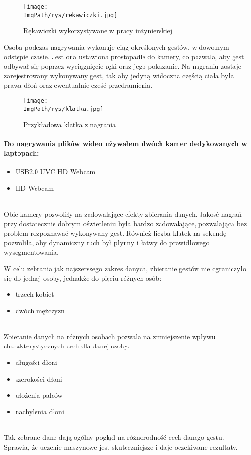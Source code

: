 \documentclass[a4paper,12pt,twoside,openany]{report}
\newcommand{\ImgPath}{.}
\begin{document}
\begin{figure}[H]	
	\centering
	\texttt{[image: \\ImgPath/rys/rekawiczki.jpg]}
	
	\caption{Rękawiczki wykorzystywane w pracy inżynierskiej}
\end{figure}

Osoba podczas nagrywania wykonuje ciąg określonych gestów, w dowolnym odstępie czasie. Jest ona ustawiona prostopadle do kamery, co pozwala, aby gest odbywał się poprzez wyciągnięcie ręki oraz jego pokazanie. Na nagraniu zostaje zarejestrowany wykonywany gest, tak aby jedyną widoczna częścią ciała była prawa dłoń oraz ewentualnie cześć przedramienia. 

\begin{figure}[H]	
	\centering
	\texttt{[image: \\ImgPath/rys/klatka.jpg]}
	
	\caption{Przykładowa klatka z nagrania}
\end{figure}

\paragraph{Do nagrywania plików wideo używałem dwóch kamer dedykowanych w laptopach:}
\begin{itemize}
	\item USB2.0 UVC HD Webcam
	\item HD Webcam
\end{itemize}
\mbox{} \\

Obie kamery pozwoliły na zadowalające efekty zbierania danych. Jakość nagrań przy dostatecznie dobrym oświetleniu była bardzo zadowalające, pozwalająca bez problem rozpoznawać wykonywany gest. Również liczba klatek na sekundę pozwoliła, aby dynamiczny ruch był płynny i łatwy do prawidłowego wysegmentowania.

W celu zebrania jak najszerszego zakres danych, zbieranie gestów nie ograniczyło się do jednej osoby, jednakże do pięciu różnych osób:
\begin{itemize}
	\item trzech kobiet
	\item dwóch mężczyzn
\end{itemize}
\mbox{} \\
\indent 
Zbieranie danych na różnych osobach pozwala na zmniejszenie wpływu charakterystycznych cech dla danej osoby:
\begin{itemize}
	\item długości dłoni
	\item szerokości dłoni
	\item ułożenia palców
	\item nachylenia dłoni
\end{itemize}
\mbox{} \\
\indent
Tak zebrane dane dają ogólny pogląd na różnorodność cech danego gestu. Sprawia, że uczenie maszynowe jest skuteczniejsze i daje oczekiwane rezultaty. 
\end{document}
